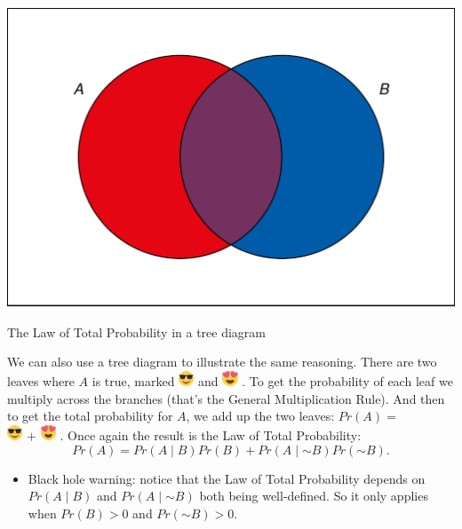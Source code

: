 \documentclass[justified]{tufte-book}
\newcommand{\given}{\mid}
\renewcommand{\neg}{\mathbin{\sim}}
\newcommand{\gt}{>}
\newcommand{\p}{Pr}
\newenvironment{warning}{\begin{itemize}\item[\faBan]}{\end{itemize}}
\theoremstyle{definition}
\theoremstyle{definition}
\theoremstyle{definition}
\theoremstyle{remark}
\begin{document}
\begin{marginfigure}
\includegraphics{_main_files/figure-latex/unnamed-chunk-73-1} \caption[The Law of Total Probability in a tree diagram]{The Law of Total Probability in a tree diagram}\label{fig:unnamed-chunk-73}
\end{marginfigure}

We can also use a tree diagram to illustrate the same reasoning. There are two leaves where \(A\) is true, marked
\includegraphics[width=0.18in]{img/emoji_shades_small} and
\includegraphics[width=0.18in]{img/emoji_hearts_small} . To get the probability of each leaf we multiply across the branches (that's the General Multiplication Rule). And then to get the total probability for \(A\), we add up the two leaves: \(\p(A) =\)\\
\includegraphics[width=0.18in]{img/emoji_shades_small} \(+\)
\includegraphics[width=0.18in]{img/emoji_hearts_small} . Once again the result is the Law of Total Probability:
\[
  \p(A) = \p(A \given B) \p(B) + \p(A \given \neg B) \p(\neg B).
\]

\begin{warning}
Black hole warning: notice that the Law of Total Probability depends on
\(\p(A \given B)\) and \(\p(A \given \neg B)\) both being well-defined.
So it only applies when \(\p(B) \gt 0\) and \(\p(\neg B) \gt 0\).
\end{warning}
\end{document}
